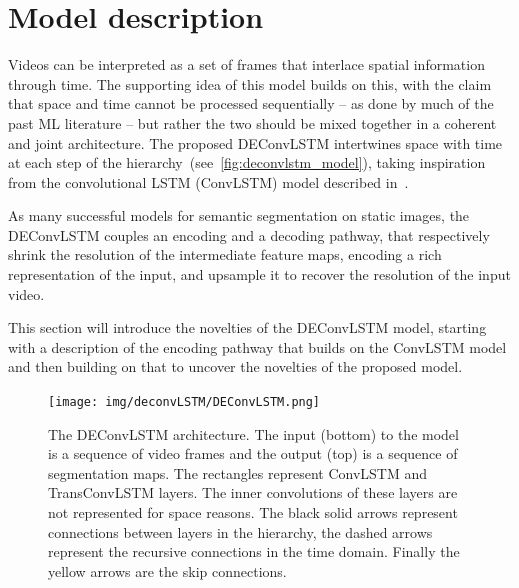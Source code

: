 

\section{Model description}\label{sec:deconvlstm_model}

Videos can be interpreted as a set of frames that interlace spatial information
through time. The supporting idea of this model builds on this, with the claim
that space and time cannot be processed sequentially -- as done by much of the
past ML literature -- but rather the two should be mixed together in a coherent
and joint architecture. The proposed DEConvLSTM intertwines space with time at
each step of the hierarchy~(see~\autoref{fig:deconvlstm_model}), taking
inspiration from the convolutional LSTM (ConvLSTM) model described in~\cite{
ShiCWYWW15}.

As many successful models for semantic segmentation on static images, the
DEConvLSTM couples an encoding and a decoding pathway, that respectively shrink
the resolution of the intermediate feature maps, encoding a rich representation
of the input, and upsample it to recover the resolution of the input video.

This section will introduce the novelties of the DEConvLSTM model, starting
with a description of the encoding pathway that builds on the ConvLSTM model
and then building on that to uncover the novelties of the proposed model.

\begin{figure}[t]
    \centering
    \texttt{[image: img/deconvLSTM/DEConvLSTM.png]}
    \caption{The DEConvLSTM architecture. The input (bottom) to the model is a
        sequence of video frames and the output (top) is a sequence of
        segmentation maps. The rectangles represent ConvLSTM and TransConvLSTM
        layers. The inner convolutions of these layers are not represented for
        space reasons. The black solid arrows represent connections between
        layers in the hierarchy, the dashed arrows represent the recursive
        connections in the time domain. Finally the yellow arrows are the skip
        connections.}\label{fig:deconvlstm_model}
\end{figure}


